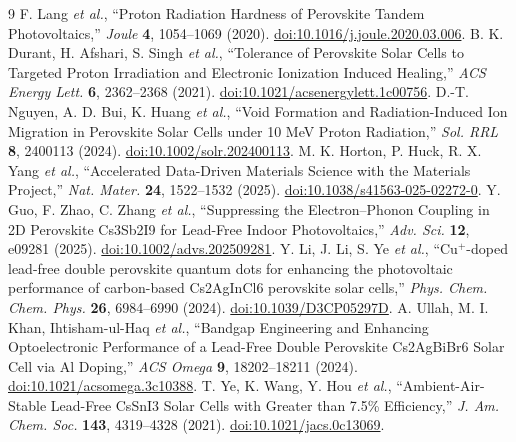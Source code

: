 \documentclass[10pt,letterpaper,twocolumn]{article}
\begin{document}
\begin{thebibliography}{9}\small
{} F. Lang \emph{et al.}, ``Proton Radiation Hardness of Perovskite Tandem Photovoltaics,'' \emph{Joule} \textbf{4}, 1054--1069 (2020). \href{https://doi.org/10.1016/j.joule.2020.03.006}{doi:10.1016/j.joule.2020.03.006}.
 B. K. Durant, H. Afshari, S. Singh \emph{et al.}, ``Tolerance of Perovskite Solar Cells to Targeted Proton Irradiation and Electronic Ionization Induced Healing,'' \emph{ACS Energy Lett.} \textbf{6}, 2362--2368 (2021). \href{https://doi.org/10.1021/acsenergylett.1c00756}{doi:10.1021/acsenergylett.1c00756}.
 D.-T. Nguyen, A. D. Bui, K. Huang \emph{et al.}, ``Void Formation and Radiation-Induced Ion Migration in Perovskite Solar Cells under 10 MeV Proton Radiation,'' \emph{Sol. RRL} \textbf{8}, 2400113 (2024). \href{https://doi.org/10.1002/solr.202400113}{doi:10.1002/solr.202400113}.
 M. K. Horton, P. Huck, R. X. Yang \emph{et al.}, ``Accelerated Data-Driven Materials Science with the Materials Project,'' \emph{Nat. Mater.} \textbf{24}, 1522--1532 (2025). \href{https://doi.org/10.1038/s41563-025-02272-0}{doi:10.1038/s41563-025-02272-0}.
 Y. Guo, F. Zhao, C. Zhang \emph{et al.}, ``Suppressing the Electron--Phonon Coupling in 2D Perovskite Cs3Sb2I9 for Lead-Free Indoor Photovoltaics,'' \emph{Adv. Sci.} \textbf{12}, e09281 (2025). \href{https://doi.org/10.1002/advs.202509281}{doi:10.1002/advs.202509281}.
 Y. Li, J. Li, S. Ye \emph{et al.}, ``Cu$^+$-doped lead-free double perovskite quantum dots for enhancing the photovoltaic performance of carbon-based Cs2AgInCl6 perovskite solar cells,'' \emph{Phys. Chem. Chem. Phys.} \textbf{26}, 6984--6990 (2024). \href{https://doi.org/10.1039/D3CP05297D}{doi:10.1039/D3CP05297D}.
 A. Ullah, M. I. Khan, Ihtisham-ul-Haq \emph{et al.}, ``Bandgap Engineering and Enhancing Optoelectronic Performance of a Lead-Free Double Perovskite Cs2AgBiBr6 Solar Cell via Al Doping,'' \emph{ACS Omega} \textbf{9}, 18202--18211 (2024). \href{https://doi.org/10.1021/acsomega.3c10388}{doi:10.1021/acsomega.3c10388}.
 T. Ye, K. Wang, Y. Hou \emph{et al.}, ``Ambient-Air-Stable Lead-Free CsSnI3 Solar Cells with Greater than 7.5\% Efficiency,'' \emph{J. Am. Chem. Soc.} \textbf{143}, 4319--4328 (2021). \href{https://doi.org/10.1021/jacs.0c13069}{doi:10.1021/jacs.0c13069}.
\end{thebibliography}
\end{document}
